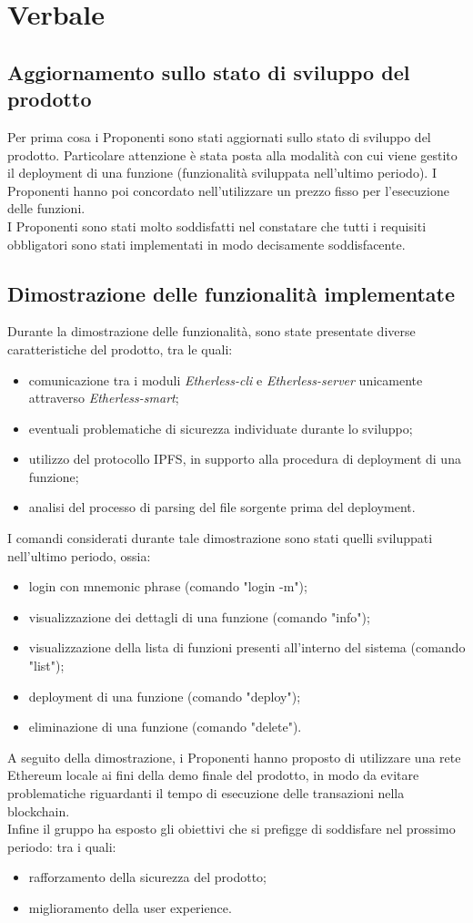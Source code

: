 \section{Verbale}
\subsection{Aggiornamento sullo stato di sviluppo del prodotto}
Per prima cosa i Proponenti sono stati aggiornati sullo stato di sviluppo del prodotto. Particolare attenzione è stata posta alla modalità con cui viene gestito il deployment di una funzione (funzionalità sviluppata nell'ultimo periodo). I Proponenti hanno poi concordato nell'utilizzare un prezzo fisso per l'esecuzione delle funzioni.
\\
I Proponenti sono stati molto soddisfatti nel constatare che tutti i requisiti obbligatori sono stati implementati in modo decisamente soddisfacente.

\subsection{Dimostrazione delle funzionalità implementate}
Durante la dimostrazione delle funzionalità, sono state presentate diverse caratteristiche del prodotto, tra le quali:
\begin{itemize}
	\item comunicazione tra i moduli \textit{Etherless-cli} e 	\textit{Etherless-server} unicamente attraverso \textit{Etherless-smart};
	\item eventuali problematiche di sicurezza individuate durante lo sviluppo;
	\item utilizzo del protocollo IPFS, in supporto alla procedura di deployment di una funzione;
	\item analisi del processo di parsing del file sorgente prima del deployment.
\end{itemize}
I comandi considerati durante tale dimostrazione sono stati quelli sviluppati nell'ultimo periodo, ossia:
\begin{itemize}
	\item login con mnemonic phrase (comando "login -m");
	\item visualizzazione dei dettagli di una funzione (comando "info");
	\item visualizzazione della lista di funzioni presenti all'interno del sistema (comando "list");
	\item deployment di una funzione (comando "deploy");
	\item eliminazione di una funzione (comando "delete").
\end{itemize}
A seguito della dimostrazione, i Proponenti hanno proposto di utilizzare una rete Ethereum locale ai fini della demo finale del prodotto, in modo da evitare problematiche riguardanti il tempo di esecuzione delle transazioni nella blockchain. \\
Infine il gruppo ha esposto gli obiettivi che si prefigge di soddisfare nel prossimo periodo: tra i quali:
\begin{itemize}
	\item rafforzamento della sicurezza del prodotto;
	\item miglioramento della user experience.
\end{itemize}
